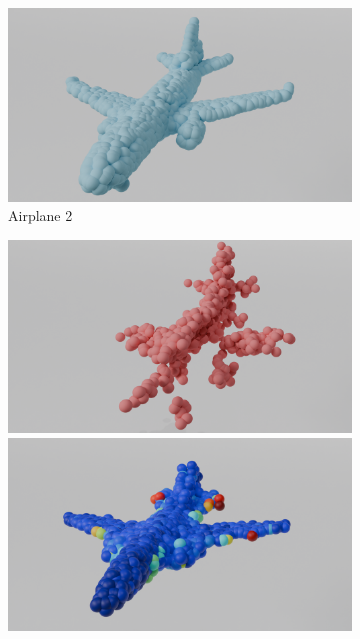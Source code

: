 \begin{figure}[htb]
\begin{subfigure}[t]{0.315\textwidth}
            \includegraphics[width=\textwidth]{figures/com_ap2.png}
            \caption{Airplane 2}
          \end{subfigure}\hfill
          \begin{subfigure}[t]{0.315\textwidth}
            \includegraphics[width=\textwidth]{figures/part_ap3.png}
            \includegraphics[width=\textwidth]{figures/dc_lin_ap3.png}

\end{subfigure}
\end{figure}

